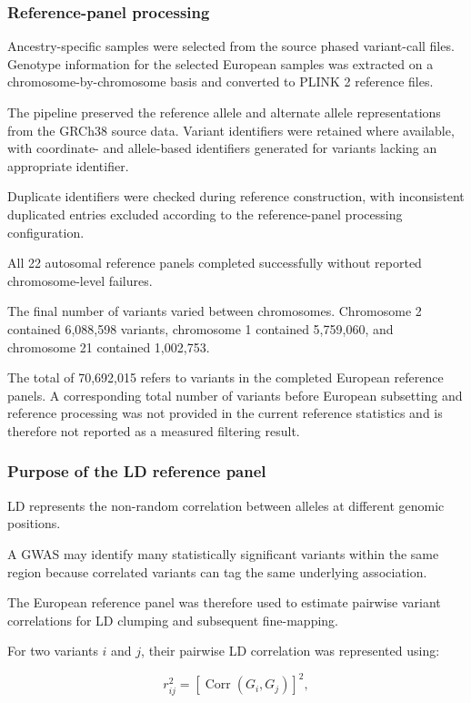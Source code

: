 \documentclass[11pt,a4paper]{article}
\begin{document}
\subsubsection{Reference-panel processing}

Ancestry-specific samples were selected from the
source phased variant-call files. Genotype information
for the selected European samples was extracted on
a chromosome-by-chromosome basis and converted to
PLINK 2 reference files.

The pipeline preserved the reference allele and
alternate allele representations from the GRCh38
source data. Variant identifiers were retained
where available, with coordinate- and allele-based
identifiers generated for variants lacking an
appropriate identifier.

Duplicate identifiers were checked during reference
construction, with inconsistent duplicated entries
excluded according to the reference-panel processing
configuration.

All 22 autosomal reference panels completed
successfully without reported chromosome-level
failures.

The final number of variants varied between
chromosomes. Chromosome 2 contained 6,088,598
variants, chromosome 1 contained 5,759,060, and
chromosome 21 contained 1,002,753.

The total of 70,692,015 refers to variants in the
completed European reference panels. A corresponding
total number of variants before European subsetting
and reference processing was not provided in the
current reference statistics and is therefore not
reported as a measured filtering result.

\subsubsection{Purpose of the LD reference panel}

LD represents the non-random correlation between
alleles at different genomic positions.

A GWAS may identify many statistically significant
variants within the same region because correlated
variants can tag the same underlying association.

The European reference panel was therefore used
to estimate pairwise variant correlations for
LD clumping and subsequent fine-mapping.

For two variants $i$ and $j$, their pairwise
LD correlation was represented using:

\begin{equation}
r_{ij}^{2}
=
\left[
\operatorname{Corr}(G_i,G_j)
\right]^2,
\end{equation}
\end{document}
